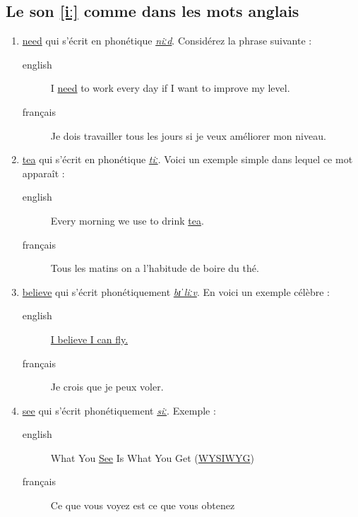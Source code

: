 \subsection{Le son \href{https://youtu.be/EuZa9-QbhG8}{[iː]} comme dans les mots anglais}
\label{sec:org62768e9}
\begin{enumerate}
\item \href{http://www.wordreference.com/enfr/need}{need} qui s'écrit en phonétique \href{https://en.oxforddictionaries.com/definition/need}{\emph{niːd}}. Considérez la
phrase suivante :
\begin{description}
\item[{english}] \textenglish{I \href{https://youtu.be/p0quLJutRC8}{need} to work every day if I want to improve my level.}
\item[{français}] Je dois travailler tous les jours si je veux
améliorer mon niveau.
\end{description}
\item \href{http://www.wordreference.com/enfr/tea}{tea} qui s'écrit en phonétique \href{https://en.oxforddictionaries.com/definition/tea}{\emph{tiː}}. Voici un exemple simple dans
lequel ce mot apparaît :
\begin{description}
\item[{english}] \textenglish{Every morning we use to drink \href{https://youtu.be/Euh8dY4EU9o}{tea}.}
\item[{français}] Tous les matins on a l'habitude de boire du thé.
\end{description}
\item \href{http://www.wordreference.com/enfr/believe}{believe} qui s'écrit phonétiquement \href{https://en.oxforddictionaries.com/definition/believe}{\emph{bɪˈliːv}}. En voici un exemple
célèbre :
\begin{description}
\item[{english}] \href{https://youtu.be/GIQn8pab8Vc}{\textenglish{I believe I can fly.}}
\item[{français}] Je crois que je peux voler.
\end{description}
\item \href{http://www.wordreference.com/enfr/see}{see} qui s'écrit phonétiquement \href{https://en.oxforddictionaries.com/definition/see}{\emph{siː}}. Exemple :
\begin{description}
\item[{english}] \textenglish{What You \href{https://youtu.be/Dpf2yHjBVYM}{See} Is What You Get (\href{https://fr.wikipedia.org/wiki/What\_you\_see\_is\_what\_you\_get}{WYSIWYG})}
\item[{français}] Ce que vous voyez est ce que vous obtenez
\end{description}
\end{enumerate}

